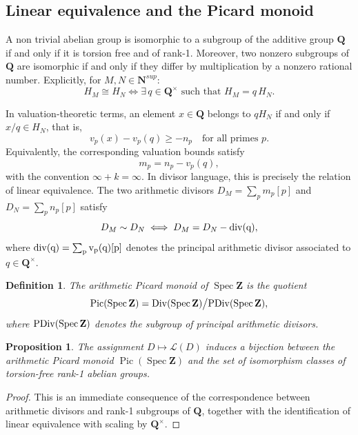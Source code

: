 \documentclass[11pt,a4paper]{article}
\newcommand{\Q}{\mathbf{Q}}
\newcommand{\Z}{\mathbf{Z}}
\newcommand{\N}{\mathbf{N}}
\def\N{{\mathbf N}}
\def\spz{\Spec \Z}
\newcommand{\Spec}{\operatorname{Spec}}
\def\Pic{\operatorname{Pic}}
\def\Div{{\rm Div}}
\def\PDiv{{\rm PDiv}}
\def\spz{\Spec \Z}
\theoremstyle{plain}
\newtheorem{defn}[thm]{Definition}
\newtheorem{prop}[thm]{Proposition}
\theoremstyle{definition} %
\begin{document}
\subsection{Linear equivalence and the Picard monoid}

A non trivial abelian group is isomorphic to a subgroup of the additive group $\Q$
if and only if it is torsion free and of rank-1.
Moreover, two nonzero subgroups of $\Q$ are isomorphic if and only if they differ
by multiplication by a nonzero rational number.
Explicitly, for $M,N\in \N^{sup}$:
\[
H_M \cong H_N
\iff
\exists\, q \in \Q^\times \text{ such that } H_M = q\,H_N .
\]

In valuation-theoretic terms, an element $x\in\Q$ belongs to $qH_N$ if and only if
$x/q\in H_N$, that is,
\[
v_p(x)-v_p(q)\ge -n_p \quad \text{for all primes } p.
\]
Equivalently, the corresponding valuation bounds satisfy
\[
m_p = n_p - v_p(q),
\]
with the convention $\infty + k = \infty$.
In divisor language, this is precisely the relation of linear equivalence.
The two arithmetic divisors $D_M=\sum_p m_p[p]$ and $D_N=\sum_p n_p[p]$ satisfy
\[
D_M \sim D_N
\iff
D_M = D_N - \rm{div}(q),
\]
where $\rm{div}(q)=\sum_p v_p(q)[p]$ denotes the principal arithmetic divisor associated
to $q\in\Q^\times$.


\begin{defn} The arithmetic Picard monoid of $\spz$ is  the quotient
\[
\Pic(\spz)
=
\Div(\spz)\big/ \PDiv(\spz),
\]
where $\PDiv(\spz)$ denotes the subgroup of principal arithmetic divisors.
\end{defn}

\begin{prop}\label{rankone}
The assignment $D\mapsto \mathcal L(D)$ induces a bijection between the arithmetic
Picard monoid $\Pic(\spz)$ and the set of isomorphism classes of torsion-free
rank-1 abelian groups.
\end{prop}

\begin{proof}
This is an immediate consequence of the correspondence between arithmetic divisors
and rank-1 subgroups of $\Q$, together with the identification of linear equivalence
with scaling by $\Q^\times$.
\end{proof}
\end{document}
